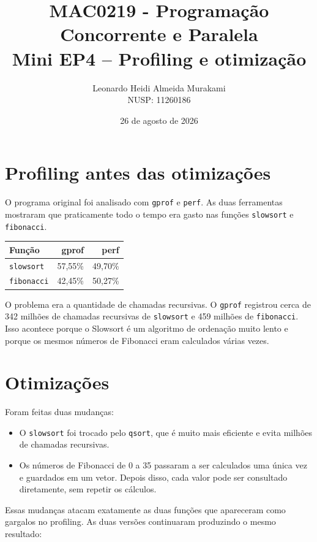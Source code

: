\documentclass[11pt,a4paper]{article}
\title{MAC0219 - Programação Concorrente e Paralela\\Mini EP4 -- Profiling e otimização}
\author{Leonardo Heidi Almeida Murakami\\NUSP: 11260186}
\date{26 de agosto de 2026}
\begin{document}
\maketitle

\section{Profiling antes das otimizações}

O programa original foi analisado com \texttt{gprof} e \texttt{perf}. As duas ferramentas mostraram que praticamente todo o tempo era gasto nas funções \texttt{slowsort} e \texttt{fibonacci}.

\begin{table}[ht]
\centering
\begin{tabular}{lrr}
\toprule
Função & gprof & perf \\
\midrule
\texttt{slowsort} & 57,55\% & 49,70\% \\
\texttt{fibonacci} & 42,45\% & 50,27\% \\
\bottomrule
\end{tabular}
\end{table}

O problema era a quantidade de chamadas recursivas. O \texttt{gprof} registrou cerca de 342 milhões de chamadas recursivas de \texttt{slowsort} e 459 milhões de \texttt{fibonacci}. Isso acontece porque o Slowsort é um algoritmo de ordenação muito lento e porque os mesmos números de Fibonacci eram calculados várias vezes.

\section{Otimizações}

Foram feitas duas mudanças:

\begin{itemize}
  \item O \texttt{slowsort} foi trocado pelo \texttt{qsort}, que é muito mais eficiente e evita milhões de chamadas recursivas.
  \item Os números de Fibonacci de 0 a 35 passaram a ser calculados uma única vez e guardados em um vetor. Depois disso, cada valor pode ser consultado diretamente, sem repetir os cálculos.
\end{itemize}

Essas mudanças atacam exatamente as duas funções que apareceram como gargalos no profiling. As duas versões continuaram produzindo o mesmo resultado:
\end{document}
